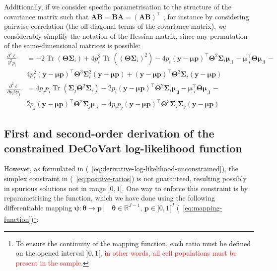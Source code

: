 \documentclass[long, final]{jobim}
\DeclareMathOperator*{\Tr}{Tr}
\newcommand \RR {\mathbb{R}}
\begin{document}
Additionally, if we consider specific parametrisation to the structure of the covariance matrix such that $\boldsymbol{A}\boldsymbol{B}=\boldsymbol{B}\boldsymbol{A}=(\boldsymbol{A}\boldsymbol{B})^\top$ , for instance by considering pairwise correlation (the off-diagonal terms of the covariance matrix), we considerably simplify the notation of the Hessian matrix, since any permutation of the same-dimensional matrices is possible: 
\begin{equation*}
    \begin{aligned}
 \frac{\partial^2 \ell}{\partial^2 p_i}& =
-2\Tr \left(\boldsymbol{\Theta}\boldsymbol{\Sigma}_i\right) + 4p_i^2 \Tr \left(\left(\boldsymbol{\Theta}\boldsymbol{\Sigma}_i\right)^2\right) 
-4p_i(\boldsymbol{y} - \boldsymbol{\mu} \boldsymbol{p})^\top\boldsymbol{\Theta}^2 \boldsymbol{\Sigma}_i  \boldsymbol{\mu_{.i}}\, - \boldsymbol{\mu}_{.i}^\top\boldsymbol{\Theta} \boldsymbol{\mu_{.i}} \, - \\
&4p_i^2 (\boldsymbol{y} - \boldsymbol{\mu} \boldsymbol{p})^\top \boldsymbol{\Theta}^3  \boldsymbol{\Sigma}_i^2 (\boldsymbol{y} - \boldsymbol{\mu} \boldsymbol{p}) + (\boldsymbol{y} - \boldsymbol{\mu} \boldsymbol{p})^\top \boldsymbol{\Theta}^2  \boldsymbol{\Sigma}_i  (\boldsymbol{y} - \boldsymbol{\mu} \boldsymbol{p})\\
\frac{\partial^2 \ell}{\partial p_i \partial p_j} &=
4p_j p_i \Tr \left(\boldsymbol{\Sigma}_j \boldsymbol{\Theta}^2\boldsymbol{\Sigma}_i \right)
-2p_i(\boldsymbol{y} - \boldsymbol{\mu} \boldsymbol{p})^\top\boldsymbol{\Theta}^2 \boldsymbol{\Sigma}_i  \boldsymbol{\mu_{.j}} - \boldsymbol{\mu}_{.i}^\top\boldsymbol{\Theta} \boldsymbol{\mu_{.j}} \, - \\
& 2p_j (\boldsymbol{y} - \boldsymbol{\mu} \boldsymbol{p})^\top \boldsymbol{\Theta}^2 \boldsymbol{\Sigma}_j \boldsymbol{\mu}_{.i}\, -
4p_ip_j(\boldsymbol{y} - \boldsymbol{\mu} \boldsymbol{p})^\top\boldsymbol{\Theta}^3\boldsymbol{\Sigma}_i \boldsymbol{\Sigma}_j (\boldsymbol{y} - \boldsymbol{\mu} \boldsymbol{p})
  \end{aligned}
\end{equation*}


\subsection{First and second-order derivation of the constrained DeCoVart log-likelihood function}
\label{subsubsec:contrained-optimisation}


However, as formulated in (\equationname~\ref{eq:derivative-log-likelihood-unconstrained}), the simplex constraint in (\equationname~\ref{eq:positive-ratios}) is not guaranteed, resulting possibly in spurious solutions not in range $]0, 1[$. One way to enforce this constraint is by reparametrising the function, which we have done using the following differentiable mapping $\boldsymbol{\psi}:\boldsymbol{\theta}  \to  \boldsymbol{p} \, | \quad  \boldsymbol{\theta} \in \RR^{J-1} , \, \boldsymbol{p} \in ]0, 1[^{J}$ (\equationname~\ref{eq:mapping-function})\footnote{To ensure the continuity of the mapping function, each ratio must be defined on the opened interval $]0, 1[$, \textcolor{red}{in other words, all cell populations must be present in the sample.}}:
\end{document}
